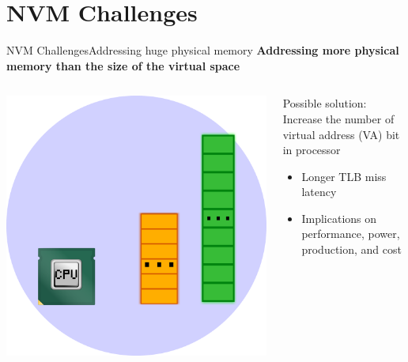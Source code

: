 \documentclass[10pt]{beamer}
\begin{document}
\section{NVM Challenges}
\begin{frame}{NVM Challenges}{Addressing huge physical memory}
  \textbf{Addressing more physical memory than the size of the virtual space}

  \begin{columns}[T]
    \begin{column}{.2\textwidth}
      \includegraphics[width=1.8\textwidth, keepaspectratio=true]{images/increase_physical_address.png}
    \end{column} \pause

    \hfill
    \begin{column}{.7\textwidth}
      Possible solution: Increase the number of virtual address (VA) bit in
      processor \pause
      \begin{itemize}
        \item Longer TLB miss latency \pause
        \item Implications on performance, power, production, and cost
      \end{itemize}
    \end{column}
  \end{columns}
\end{frame}
\end{document}
